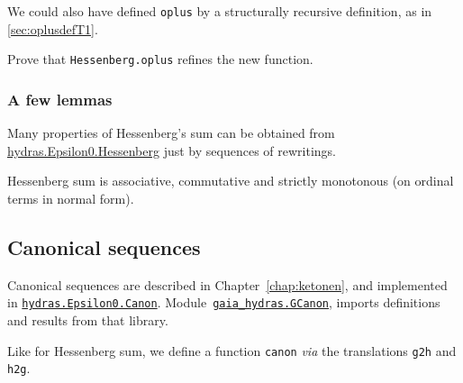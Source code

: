 \vspace{4pt} 
\noindent



\begin{exercise}
  
  We could also have defined \texttt{oplus} by a structurally
  recursive definition, as in 
  \vref{sec:oplusdefT1}.
  

Prove that \texttt{Hessenberg.oplus} refines
the new function. 
\end{exercise}




\subsubsection{A few lemmas}

Many properties of Hessenberg's sum can be obtained from
\href{../theories/html/hydras.Epsilon0.Hessenberg.html}{hydras.Epsilon0.Hessenberg} just by sequences of rewritings.





Hessenberg sum is associative, commutative and strictly monotonous (on ordinal terms in normal form).


\subsection{Canonical sequences}
\label{sect:gcanon}

Canonical sequences are described in Chapter~\vref{chap:ketonen}, and implemented in
\href{../theories/html/hydras.Epsilon0.Canon.html}%
{\texttt{hydras.Epsilon0.Canon}}.
Module~\href{../theories/html/gaia_hydras.GCanon.html}%
{\texttt{gaia\_hydras.GCanon}}, imports definitions and results from that library.


Like for Hessenberg sum, we define a function \texttt{canon}
\emph{via} the
translations \texttt{g2h} and \texttt{h2g}.

